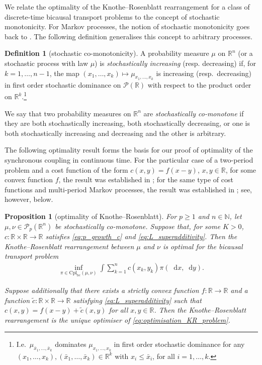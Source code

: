\documentclass[oneside]{amsart}
\newtheorem{proposition}[theorem]{Proposition}
\theoremstyle{definition}
\newtheorem{definition}[theorem]{Definition}
\newcommand{\R}{\mathbb R}
\newcommand{\Pc}{\mathcal P}
\newcommand{\cplbc}{\mathrm{Cpl}_{\mathrm{bc}}}
\newcommand{\dx}{\mathop{}\!\mathrm{d}x}
\newcommand{\dy}{\mathop{}\!\mathrm{d}y}
\def\R{{\mathbb R}}
\numberwithin{equation}{section}
\begin{document}
We relate the optimality of the Knothe--Rosenblatt rearrangement for a class of discrete-time bicausal transport problems to the concept of stochastic monotonicity.
For Markov processes, the notion of stochastic monotonicity goes back to \citet{Da68}. The following definition generalises this concept to arbitrary processes.
	
\begin{definition}[stochastic co-monotonicity]\label{def:stochastic_mon}
	A probability measure $\mu$ on $\R^n$ (or a stochastic process with law $\mu$) is \emph{stochastically increasing} (resp. decreasing) if, for $k = 1, \dotsc, n -1$, the map $(x_1,\dots,x_k)\mapsto\mu_{x_1,\dotsc,x_k}$ is increasing (resp.~decreasing) in first order stochastic dominance on $\Pc(\R)$ with respect to the product order on $\R^k$.\footnote{I.e.~$\mu_{\bar x_1,\dotsc,\bar x_k}$ dominates $\mu_{x_1,\dotsc, x_k}$ in first order stochastic dominance for any $(x_1, \dotsc, x_k), (\bar x_1, \dotsc, \bar x_k) \in \R^k$ with $x_i \leq \bar x_i$, for all $i = 1, \dots, k$.}
	
	We say that two probability measures on $\R^n$ are \emph{stochastically co-monotone} if they are both stochastically increasing, both stochastically decreasing, or one is both stochastically increasing and decreasing and the other is arbitrary. 
\end{definition}

The following optimality result forms the basis for our proof of optimality of the synchronous coupling in continuous time.
For the particular case of a two-period problem and a cost function of the form $c(x,y)=f(x-y)$, $x,y\in\R$, for some convex function $f$, the result was established in \cite[Corollary~2]{Ru85}; for the same type of cost functions and multi-period Markov processes, the result was established in \cite[Proposition~5.3]{BaBeLiZa17}; see, however,  below.


\begin{proposition}[optimality of Knothe--Rosenblatt]\label{prop:kr-discrete-optimality}
	For $p\ge 1$ and $n\in\mathbb{N}$, let $\mu,\nu \in \Pc_p(\R^n)$ be stochastically co-monotone.
	 Suppose that, for some $K > 0$, $c \colon \R\times\R\to\R$ satisfies 	\eqref{eq:p_growth_c} and \eqref{eq:L_superadditivity}.
	Then the Knothe--Rosenblatt rearrangement between $\mu$ and $\nu$
	is optimal for the bicausal transport problem
	\begin{align}\label{eq:optimisation_KR_problem}
		\inf_{\pi \in \cplbc(\mu, \nu)}\int \sum_{k=1}^nc(x_k,y_k)\pi(\dx,\dy).
	\end{align}

    Suppose additionally that there exists a strictly convex function $f \colon \R \to \R$ and a function $\tilde c \colon \R \times \R \to \R$ satisfying \eqref{eq:L_superadditivity} such that $c(x, y) = f(x - y) + \tilde c(x, y)$ for all $x, y \in \R$. Then the Knothe--Rosenblatt rearrangement is the unique optimiser of \eqref{eq:optimisation_KR_problem}.
\end{proposition}
\end{document}
